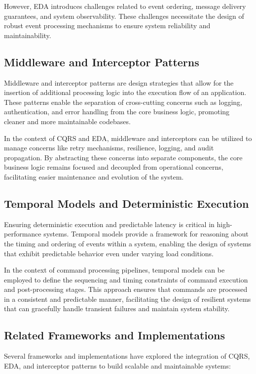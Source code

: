 However, EDA introduces challenges related to event ordering, message delivery guarantees, and system observability. These challenges necessitate the design of robust event processing mechanisms to ensure system reliability and maintainability.

\subsection{Middleware and Interceptor Patterns}
Middleware and interceptor patterns are design strategies that allow for the insertion of additional processing logic into the execution flow of an application. These patterns enable the separation of cross-cutting concerns such as logging, authentication, and error handling from the core business logic, promoting cleaner and more maintainable codebases.

In the context of CQRS and EDA, middleware and interceptors can be utilized to manage concerns like retry mechanisms, resilience, logging, and audit propagation. By abstracting these concerns into separate components, the core business logic remains focused and decoupled from operational concerns, facilitating easier maintenance and evolution of the system.

\subsection{Temporal Models and Deterministic Execution}
Ensuring deterministic execution and predictable latency is critical in high-performance systems. Temporal models provide a framework for reasoning about the timing and ordering of events within a system, enabling the design of systems that exhibit predictable behavior even under varying load conditions.

In the context of command processing pipelines, temporal models can be employed to define the sequencing and timing constraints of command execution and post-processing stages. This approach ensures that commands are processed in a consistent and predictable manner, facilitating the design of resilient systems  that can gracefully handle transient failures and maintain system stability.

\subsection{Related Frameworks and Implementations}
Several frameworks and implementations have explored the integration of CQRS, EDA, and interceptor patterns to build scalable and maintainable systems:

